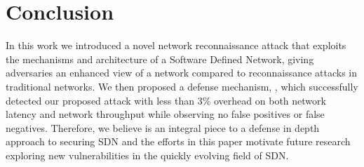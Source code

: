 \section{Conclusion}
\label{sec:conc}

In this work we introduced a novel network reconnaissance attack that
exploits the mechanisms and architecture of a Software Defined Network,
giving adversaries an enhanced view of a network compared to 
reconnaissance attacks in traditional networks. We then proposed a 
defense mechanism, \name, which successfully detected our proposed
attack with less than 3\% overhead on both network latency and network
throughput while observing no false positives or false negatives. 
Therefore, we believe \name is an integral piece to a defense in depth
approach to securing SDN and the efforts in this paper motivate future
research exploring new vulnerabilities in the quickly evolving field of
SDN.
